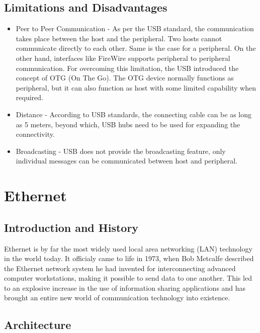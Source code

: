 \documentclass{article}
\begin{document}
\subsection{Limitations and Disadvantages}
\begin{itemize}
    \item Peer to Peer Communication - As per the USB standard, the communication takes place between the host and the peripheral. Two hosts cannot communicate directly to each other. Same is the case for a peripheral. On the other hand, interfaces like FireWire supports peripheral to peripheral communication. For overcoming this limitation, the USB introduced the concept of OTG (On The Go). The OTG device normally functions as peripheral, but it can also function as host with some limited capability when required. 
    \item Distance - According to USB standards, the connecting cable can be as long as 5 meters, beyond which, USB hubs need to be used for expanding the connectivity.
    \item Broadcasting -  USB does not provide the broadcasting feature, only individual messages can be communicated between host and peripheral.
    
\end{itemize}

    
    
\section{Ethernet}
\subsection{Introduction and History}
Ethernet is by far the most widely used local area networking (LAN) technology in the world today. It officialy came to life in 1973, when Bob Metcalfe described the Ethernet network system he had invented for interconnecting advanced computer workstations, making it possible to send data to one another. This led to an explosive increase in the use of information sharing applications and has brought an entire new world of communication technology into existence.

\subsection{Architecture}
\end{document}
